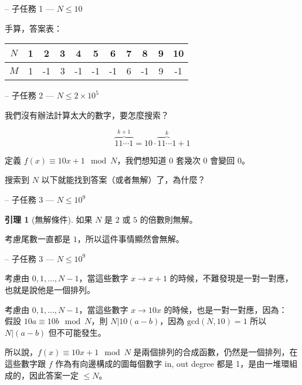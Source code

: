 \documentclass[hyperref,UTF8,notheorems,xcolor={dvipsnames}]{beamer}
\newcommand{\btitle}[1]{{\secname} -- #1}
\theoremstyle{definition}
\newtheorem{lemma}{引理}
\begin{document}
\begin{frame}[fragile]{\btitle{子任務 1 --- $N \leq 10$}}
	
	手算，答案表：

	\begin{tabular}{c|c|c|c|c|c|c|c|c|c|c}
	$N$ & 1 & 2 & 3 & 4 & 5 & 6 & 7 & 8 & 9 & 10 \\
	\hline
	$M$ & 1 & -1 & 3 & -1 & -1 & -1 & 6 & -1 & 9 & -1
	\end{tabular}

\end{frame}

\begin{frame}[fragile]{\btitle{子任務 2 --- $N \leq 2 \times 10^5$}}
	
	我們沒有辦法計算太大的數字，要怎麼搜索？

	{
		\[ \overset{k+1}{\overbrace{11\cdots1}} = 10 \cdot \overset{k}{\overbrace{11\cdots1}} + 1 \]

		定義 $f(x) \equiv 10 x + 1 \mod N$，我們想知道 $0$ 套幾次 $0$ 會變回 $0$。  

		搜索到 $N$ 以下就能找到答案（或者無解）了，為什麼？  
	}

\end{frame}

\begin{frame}[fragile]{\btitle{子任務 3 --- $N \leq 10^9$}}
	
	\begin{lemma}[無解條件]
		如果 $N$ 是 $2$ 或 $5$ 的倍數則無解。  
	\end{lemma}

	考慮尾數一直都是 $1$，所以這件事情顯然會無解。  

\end{frame}

\begin{frame}[fragile]{\btitle{子任務 3 --- $N \leq 10^9$}}
	
	考慮由 $0, 1, \ldots, N - 1$，當這些數字 $x \rightarrow x + 1$ 的時候，不難發現是一對一對應，也就是說他是一個排列。  

	考慮由 $0, 1, \ldots, N - 1$，當這些數字 $x \rightarrow 10x$ 的時候，也是一對一對應，因為：\\
	假設 $10a \equiv 10b \mod N$，則 $N | 10(a - b)$，因為 $\mathrm{gcd}(N, 10) = 1$ 所以 $N | (a - b)$ 但不可能發生。  
	
	所以說，$f(x) \equiv 10 x + 1 \mod N$ 是兩個排列的合成函數，仍然是一個排列，在這些數字跟 $f$ 作為有向邊構成的圖每個數字 in, out degree 都是 1，是由一堆環組成的，因此答案一定 $\leq N$。  

\end{frame}
\end{document}
